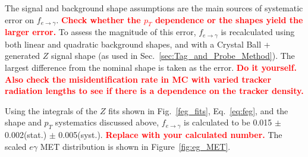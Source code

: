 \documentclass[dissertation.tex]{subfiles}
\begin{document}


The signal and background shape assumptions are the main sources of systematic error on $f_{e\rightarrow\gamma}$.  \textcolor{red}{\textbf{Check whether the $p_{T}$ dependence or the shapes yield the larger error.}}  To assess the magnitude of this error, $f_{e\rightarrow\gamma}$ is recalculated using both linear and quadratic background shapes, and with a Crystal Ball + generated $Z$ signal shape (as used in Sec.~\ref{sec:Tag_and_Probe_Method}).  The largest difference from the nominal shape is taken as the error.  \textcolor{red}{\textbf{Do it yourself.  Also check the misidentification rate in MC with varied tracker radiation lengths to see if there is a dependence on the tracker density.}}

Using the integrals of the $Z$ fits shown in Fig.~\ref{feg_fits}, Eq.~\ref{eq:feg}, and the shape  and $p_{T}$ systematics discussed above, $f_{e\rightarrow\gamma}$ is calculated to be 0.015 $\pm$ 0.002(stat.) $\pm$ 0.005(syst.).  \textcolor{red}{\textbf{Replace with your calculated number.}}  The scaled $e\gamma$ MET distribution is shown in Figure~\ref{fig:eg_MET}.
\end{document}
